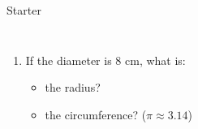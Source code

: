 \documentclass{beamer}
\newcommand{\ashow}[1]{\uncover<2->{\textcolor{red}{\small #1}}}
\begin{document}
\begin{frame}{Starter}
\begin{columns}
\begin{enumerate}
  \item If the diameter is $8$ cm, what is:
    \begin{itemize}
      \item the radius? \ashow{$4$ cm}
      \item the circumference? ($\pi \approx 3.14$) \ashow{$25.12$ cm}
    \end{itemize}
 
\end{enumerate}

\end{columns}
\end{frame}
\end{document}
